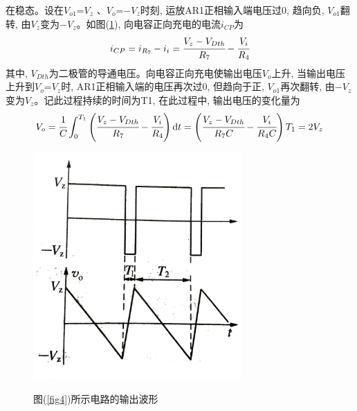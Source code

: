 \documentclass[a4paper]{article}
\begin{document}
在稳态。设在$V_{o1}$=$V_z$ 、$V_o$=$-V_z$时刻, 运放AR1正相输入端电压过0, 趋向负, $V_{o1}$翻转, 由$V_z$变为$-V_z$。如图(\ref{fig5}), 向电容正向充电的电流$i_{CP}$为
\begin{equation}
i_{CP} = i_{R_7} - i_i = \cfrac{V_z - V_{Dth}}{R_7} - \cfrac{V_i}{R_4}\label{eq1}
\end{equation}
其中, $V_{Dth}$为二极管的导通电压。向电容正向充电使输出电压$V_o$上升, 当输出电压上升到$V_o$=$V_z$时, AR1正相输入端的电压再次过0, 但趋向于正, $V_{o1}$再次翻转, 由$-V_z$变为$V_z$。记此过程持续的时间为T1, 在此过程中, 输出电压的变化量为
\begin{equation}
V_o = \cfrac{1}{C}\int^{T_1}_{0}\left(\cfrac{V_z - V_{Dth}}{R_7} - \cfrac{V_i}{R_4}\right)\text{d}t = \left(\cfrac{V_z - V_{Dth}}{R_7C} - \cfrac{V_i}{R_4C}\right)T_1 = 2V_z\label{eq2}
\end{equation}

\begin{figure}[!h]
\centering
\includegraphics[width=8cm]{fig/fig5.jpg}\\
\caption{图(\ref{fig4})所示电路的输出波形}\label{fig5}
\end{figure}
    
\end{document}
